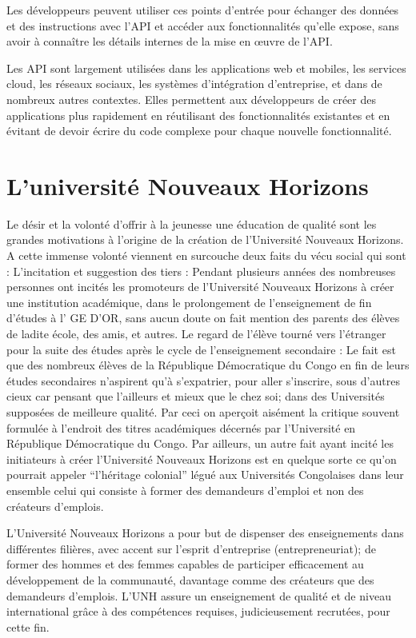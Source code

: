 Les développeurs peuvent utiliser ces points d'entrée pour échanger des données et des instructions avec l'API et accéder aux fonctionnalités qu'elle expose, sans avoir à connaître les détails internes de la mise en œuvre de l'API.

Les API sont largement utilisées dans les applications web et mobiles, les services cloud, les réseaux sociaux, les systèmes d'intégration d'entreprise, et dans de nombreux autres contextes. Elles permettent aux développeurs de créer des applications plus rapidement en réutilisant des fonctionnalités existantes et en évitant de devoir écrire du code complexe pour chaque nouvelle fonctionnalité.

\section{L'université Nouveaux Horizons}\label{subsec:unh}
Le désir et la volonté d’offrir à la jeunesse une éducation de qualité sont les grandes motivations à l'origine de la création de l'Université Nouveaux Horizons. A cette immense volonté viennent en surcouche deux faits du vécu social qui sont : 
L'incitation et suggestion des tiers : 
Pendant plusieurs années des nombreuses personnes ont incités les promoteurs de l’Université Nouveaux Horizons à  créer une institution académique, dans le prolongement de l’enseignement de fin d’études  à l' GE D’OR, sans aucun doute on fait mention des parents des élèves de ladite école, des amis, et autres. 
Le regard de l’élève tourné vers l’étranger pour la suite des études après le cycle de l’enseignement secondaire : 
Le fait est que des nombreux élèves de la République Démocratique du Congo en fin de leurs études secondaires n’aspirent qu'à s'expatrier, pour aller s'inscrire, sous d’autres cieux car pensant que l’ailleurs et mieux que le chez soi; dans des Universités supposées de meilleure qualité. Par ceci on aperçoit aisément la critique souvent formulée à l’endroit des titres académiques décernés par l'Université en République Démocratique du Congo.
Par ailleurs, un autre fait ayant incité les initiateurs à créer l'Université Nouveaux Horizons est en quelque sorte ce qu’on pourrait appeler “l'héritage colonial” légué aux Universités Congolaises dans leur ensemble celui qui consiste à former des demandeurs d’emploi et non des créateurs d’emplois.

L'Université Nouveaux Horizons a pour but de dispenser des enseignements dans différentes filières, avec accent sur l'esprit d'entreprise (entrepreneuriat); de former des hommes et des femmes capables de participer efficacement au développement de la communauté, davantage comme des créateurs que des demandeurs d'emplois.
L'UNH assure un enseignement de qualité et de niveau international grâce à des compétences requises, judicieusement recrutées, pour cette fin.

